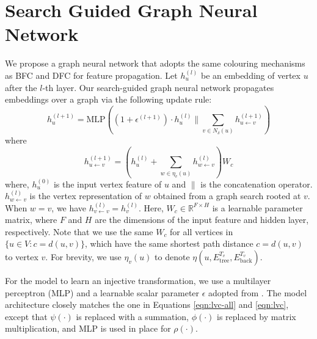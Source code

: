 
\section{Search Guided Graph Neural Network}

We propose a graph neural network that adopts the same colouring mechanisms as BFC and DFC for feature propagation. Let $h_u^{(l)}$ be an embedding of vertex $u$ after the $l$-th layer. Our search-guided graph neural network propagates embeddings over a graph via the following update rule:
\begin{equation}
\label{eqn:gnn_layer}
  h_u^{(l+1)} = \text{MLP}\left(\left(1 + \epsilon^{(l+1)}\right)\cdot h_u^{(l)} \parallel
                        \sum_{v\in N_{\delta}(u)} h_{u\leftarrow v}^{(l+1)}
  \right)
\end{equation}
where
\begin{equation}
\label{eqn:gnn_huv}
  h_{u\leftarrow v}^{(l+1)} = \left(h_u^{(l)} +
                        \sum_{
                        w \in \eta_v(u)
                        } h_{w\leftarrow v}^{(l)}
  \right)W_{c}
\end{equation}
where, $h^{(0)}_u$ is the input vertex feature of $u$ and $\parallel$ is the concatenation operator. $h^{(l)}_{w\leftarrow v}$ is the vertex representation of $w$ obtained from a graph search rooted at $v$. When $w=v$, we have $h^{(l)}_{v\leftarrow v} = h^{(l)}_v$. Here, $W_{c}\in \mathbb{R}^{F\times H}$ is a learnable parameter matrix, where $F$ and $H$ are the dimensions of the input feature and hidden layer, respectively. Note that we use the same $W_c$ for all vertices in $\{u\in V : c=d(u,v)\}$, which have the same shortest path distance $c=d(u,v)$ to vertex $v$. For brevity, we use $\eta_v(u)$ to denote $\eta(u,E^{T_v}_{\text{tree}},E^{T_v}_{\text{back}})$.

For the model to learn an injective transformation, we use a multilayer perceptron (MLP) and a learnable scalar parameter $\epsilon$ adopted from \citet{xu2018powerful}.
The model architecture closely matches the one in Equations \ref{eqn:lvc-all} and \ref{eqn:lvc}, except that $\psi(\cdot)$ is replaced with a summation, $\phi(\cdot)$ is replaced by matrix multiplication, and MLP is used in place for $\rho(\cdot)$. 

